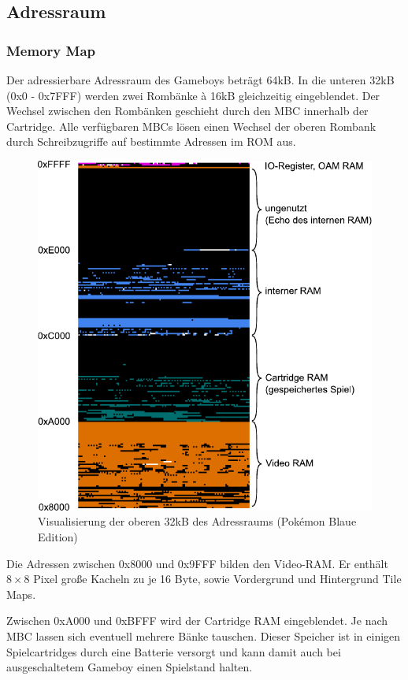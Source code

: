 \documentclass[a4paper]{scrartcl}
\begin{document}
\subsection{Adressraum}

\subsubsection{Memory Map}

Der adressierbare Adressraum des Gameboys beträgt 64kB. In die unteren 32kB (0x0 - 0x7FFF) werden zwei Rombänke à 16kB gleichzeitig eingeblendet. Der Wechsel zwischen den Rombänken geschieht durch den MBC innerhalb der Cartridge. Alle verfügbaren MBCs lösen einen Wechsel der oberen Rombank durch Schreibzugriffe auf bestimmte Adressen im ROM aus.

\begin{figure}[H]
\centering
\includegraphics[width=0.75\linewidth]{img/mmap.pdf}
\caption{Visualisierung der oberen 32kB des Adressraums (Pokémon Blaue Edition)}
\label{img:sound}
\end{figure}

Die Adressen zwischen 0x8000 und 0x9FFF bilden den Video-RAM. Er enthält $8 \times 8$ Pixel große Kacheln zu je 16 Byte, sowie Vordergrund und Hintergrund Tile Maps.

Zwischen 0xA000 und 0xBFFF wird der Cartridge RAM eingeblendet. Je nach MBC lassen sich eventuell mehrere Bänke tauschen. Dieser Speicher ist in einigen Spielcartridges durch eine Batterie versorgt und kann damit auch bei ausgeschaltetem Gameboy einen Spielstand halten.
\end{document}
